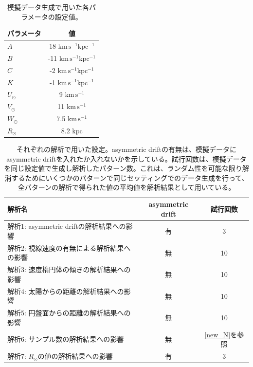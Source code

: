 \begin{table}
\begin{center}
\begin{tabular}{l|c} \hline
 \rowcolor{LightCyan}
 パラメータ & 値\\
 \hline
 $A$ & 18 $\mathrm{km\,s^{-1} kpc^{-1}}$\\
 \hline
 $B$ & -11 $\mathrm{km\,s^{-1} kpc^{-1}}$\\
 \hline
 $C$ & -2 $\mathrm{km\,s^{-1} kpc^{-1}}$\\
 \hline
 $K$ & -1 $\mathrm{km\,s^{-1} kpc^{-1}}$\\
 \hline
 $U_{\odot}$ & 9 $\mathrm{km\,s^{-1}}$\\
 \hline
 $V_{\odot}$ & 11 $\mathrm{km\,s^{-1}}$\\
 \hline
 $W_{\odot}$ & 7.5 $\mathrm{km\,s^{-1}}$\\
 \hline
 $R_{\odot}$ & 8.2 $\mathrm{kpc}$\\
 \hline
\end{tabular}
\vspace{3mm}
\caption{模擬データ生成で用いた各パラメータの設定値。}
\label{table4}
\end{center}
\end{table}



\begin{table}
\begin{center}
\begin{tabular}{l|c|c} \hline
 \rowcolor{LightCyan}
 解析名 & asymmetric drift & 試行回数 \\
 \hline
 解析1: asymmetric driftの解析結果への影響 & 有 & 3\\
 \hline
 解析2: 視線速度の有無による解析結果への影響 & 無 & 10\\
 \hline
 解析3: 速度楕円体の傾きの解析結果への影響 & 無 & 10\\
 \hline
 解析4: 太陽からの距離の解析結果への影響 & 無 & 10\\
 \hline
 解析5: 円盤面からの距離の解析結果への影響 & 無 & 10\\
 \hline
 解析6: サンプル数の解析結果への影響 & 無 & \ref{new_N}を参照\\
 \hline
 解析7: $R_{\odot}$の値の解析結果への影響 & 有 & 3\\
 \hline
\end{tabular}
\vspace{3mm}
\caption{それぞれの解析で用いた設定。asymmetric driftの有無は、模擬データにasymmetric driftを入れたか入れないかを示している。試行回数は、模擬データを同じ設定値で生成し解析したパターン数。これは、ランダム性を可能な限り解消するためにいくつかのパターンで同じセッティングでのデータ生成を行って、全パターンの解析で得られた値の平均値を解析結果として用いている。}
\label{table5}
\end{center}
\end{table}

